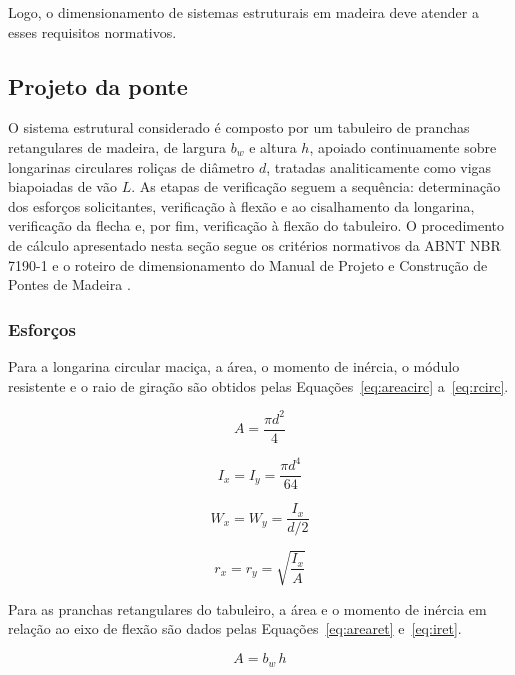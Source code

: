 Logo, o dimensionamento de sistemas estruturais em madeira deve atender a esses requisitos normativos.

\subsection{Projeto da ponte}\label{sec:projeto_ponte}

O sistema estrutural considerado é composto por um tabuleiro de pranchas retangulares de madeira, de largura $b_w$ e altura $h$, apoiado continuamente sobre longarinas circulares roliças de diâmetro $d$, tratadas analiticamente como vigas biapoiadas de vão $L$.
As etapas de verificação seguem a sequência: determinação dos esforços solicitantes, verificação à flexão e ao cisalhamento da longarina, verificação da flecha e, por fim, verificação à flexão do tabuleiro.
O procedimento de cálculo apresentado nesta seção segue os critérios normativos da ABNT NBR 7190-1 e o roteiro de dimensionamento do Manual de Projeto e Construção de Pontes de Madeira \parencite{CALIL2006}.

\subsubsection{Esforços}

Para a longarina circular maciça, a área, o momento de inércia, o módulo resistente e o raio de giração são obtidos pelas Equações~\eqref{eq:areacirc} a~\eqref{eq:rcirc}.

\begin{equation}
A = \frac{\pi d^2}{4}
\label{eq:areacirc}
\end{equation}

\begin{equation}
I_x = I_y = \frac{\pi d^4}{64}
\label{eq:icirc}
\end{equation}

\begin{equation}
W_x = W_y = \frac{I_x}{d/2}
\label{eq:wcirc}
\end{equation}

\begin{equation}
r_x = r_y = \sqrt{\frac{I_x}{A}}
\label{eq:rcirc}
\end{equation}

Para as pranchas retangulares do tabuleiro, a área e o momento de inércia em relação ao eixo de flexão são dados pelas Equações~\eqref{eq:arearet} e~\eqref{eq:iret}.

\begin{equation}
A = b_w\,h
\label{eq:arearet}
\end{equation}

